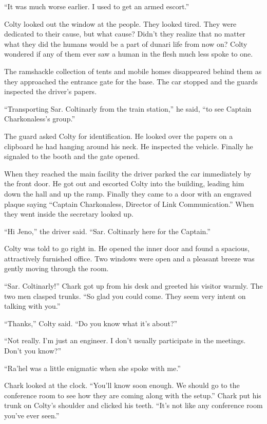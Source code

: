 ``It was much worse earlier. I used to get an armed escort.''


Colty looked out the window at the people. They looked tired. They were dedicated to their
cause, but what cause? Didn't they realize that no matter what they did the humans would be a
part of dunari life from now on? Colty wondered if any of them ever saw a human in the flesh
much less spoke to one.

The ramshackle collection of tents and mobile homes disappeared behind them as they approached
the entrance gate for the base. The car stopped and the guards inspected the driver's papers.

``Transporting Sar. Coltinarly from the train station,'' he said, ``to see Captain
Charkonaless's group.''

The guard asked Colty for identification. He looked over the papers on a clipboard he had
hanging around his neck. He inspected the vehicle. Finally he signaled to the booth and the gate
opened.

When they reached the main facility the driver parked the car immediately by the front door. He
got out and escorted Colty into the building, leading him down the hall and up the ramp. Finally
they came to a door with an engraved plaque saying ``Captain Charkonaless, Director of Link
Communication.'' When they went inside the secretary looked up.

``Hi Jeno,'' the driver said. ``Sar. Coltinarly here for the Captain.''

Colty was told to go right in. He opened the inner door and found a spacious, attractively
furnished office. Two windows were open and a pleasant breeze was gently moving through the
room.

``Sar. Coltinarly!'' Chark got up from his desk and greeted his visitor warmly. The two men
clasped trunks. ``So glad you could come. They seem very intent on talking with you.''

``Thanks,'' Colty said. ``Do you know what it's about?''

``Not really. I'm just an engineer. I don't usually participate in the meetings. Don't you
know?''

``Ra'hel was a little enigmatic when she spoke with me.''

Chark looked at the clock. ``You'll know soon enough. We should go to the conference room to see
how they are coming along with the setup.'' Chark put his trunk on Colty's shoulder and clicked
his teeth. ``It's not like any conference room you've ever seen.''

